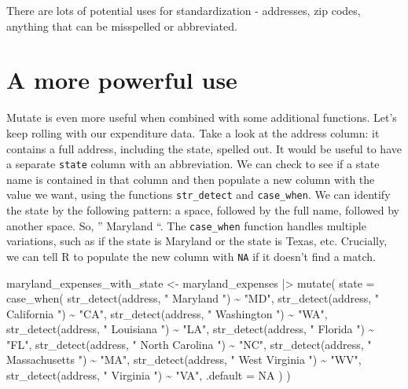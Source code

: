 \documentclass[
  letterpaper,
  DIV=11,
  numbers=noendperiod]{scrreprt}
\newenvironment{Shaded}{\begin{snugshade}}{\end{snugshade}}
\newcommand{\AttributeTok}[1]{\textcolor[rgb]{0.40,0.45,0.13}{#1}}
\newcommand{\ConstantTok}[1]{\textcolor[rgb]{0.56,0.35,0.01}{#1}}
\newcommand{\FunctionTok}[1]{\textcolor[rgb]{0.28,0.35,0.67}{#1}}
\newcommand{\NormalTok}[1]{\textcolor[rgb]{0.00,0.23,0.31}{#1}}
\newcommand{\OtherTok}[1]{\textcolor[rgb]{0.00,0.23,0.31}{#1}}
\newcommand{\SpecialCharTok}[1]{\textcolor[rgb]{0.37,0.37,0.37}{#1}}
\newcommand{\StringTok}[1]{\textcolor[rgb]{0.13,0.47,0.30}{#1}}
\begin{document}
There are lots of potential uses for standardization - addresses, zip
codes, anything that can be misspelled or abbreviated.

\hypertarget{a-more-powerful-use}{%
\section{A more powerful use}\label{a-more-powerful-use}}

Mutate is even more useful when combined with some additional functions.
Let's keep rolling with our expenditure data. Take a look at the address
column: it contains a full address, including the state, spelled out. It
would be useful to have a separate \texttt{state} column with an
abbreviation. We can check to see if a state name is contained in that
column and then populate a new column with the value we want, using the
functions \texttt{str\_detect} and \texttt{case\_when}. We can identify
the state by the following pattern: a space, followed by the full name,
followed by another space. So, '' Maryland ``. The \texttt{case\_when}
function handles multiple variations, such as if the state is Maryland
or the state is Texas, etc. Crucially, we can tell R to populate the new
column with \texttt{NA} if it doesn't find a match.

\begin{Shaded}
\begin{Highlighting}[]
\NormalTok{maryland\_expenses\_with\_state }\OtherTok{\textless{}{-}}\NormalTok{ maryland\_expenses }\SpecialCharTok{|\textgreater{}}
  \FunctionTok{mutate}\NormalTok{(}
    \AttributeTok{state =} \FunctionTok{case\_when}\NormalTok{(}
        \FunctionTok{str\_detect}\NormalTok{(address, }\StringTok{" Maryland "}\NormalTok{) }\SpecialCharTok{\textasciitilde{}} \StringTok{"MD"}\NormalTok{,}
        \FunctionTok{str\_detect}\NormalTok{(address, }\StringTok{" California "}\NormalTok{) }\SpecialCharTok{\textasciitilde{}} \StringTok{"CA"}\NormalTok{,}
        \FunctionTok{str\_detect}\NormalTok{(address, }\StringTok{" Washington "}\NormalTok{) }\SpecialCharTok{\textasciitilde{}} \StringTok{"WA"}\NormalTok{,}
        \FunctionTok{str\_detect}\NormalTok{(address, }\StringTok{" Louisiana "}\NormalTok{) }\SpecialCharTok{\textasciitilde{}} \StringTok{"LA"}\NormalTok{,}
        \FunctionTok{str\_detect}\NormalTok{(address, }\StringTok{" Florida "}\NormalTok{) }\SpecialCharTok{\textasciitilde{}} \StringTok{"FL"}\NormalTok{,}
        \FunctionTok{str\_detect}\NormalTok{(address, }\StringTok{" North Carolina "}\NormalTok{) }\SpecialCharTok{\textasciitilde{}} \StringTok{"NC"}\NormalTok{,}
        \FunctionTok{str\_detect}\NormalTok{(address, }\StringTok{" Massachusetts "}\NormalTok{) }\SpecialCharTok{\textasciitilde{}} \StringTok{"MA"}\NormalTok{,}
        \FunctionTok{str\_detect}\NormalTok{(address, }\StringTok{" West Virginia "}\NormalTok{) }\SpecialCharTok{\textasciitilde{}} \StringTok{"WV"}\NormalTok{,}
        \FunctionTok{str\_detect}\NormalTok{(address, }\StringTok{" Virginia "}\NormalTok{) }\SpecialCharTok{\textasciitilde{}} \StringTok{"VA"}\NormalTok{,}
        \AttributeTok{.default =} \ConstantTok{NA}
\NormalTok{      )}
\NormalTok{  )}
\end{Highlighting}
\end{Shaded}
\end{document}
